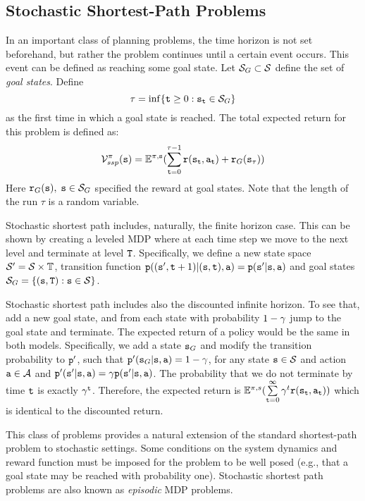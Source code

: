 \subsection{Stochastic Shortest-Path Problems}
In an important class of planning problems, the time horizon is not
set beforehand, but rather the problem continues until a certain
event occurs. This event can be defined as reaching some goal state.
Let  ${\mathcal{S}_G} \subset \mathcal{S}$ define the set of \emph{goal
states}. Define
\[\tau  = \inf \{ {\tt t} \ge 0:{{\tt s}_{\tt t}} \in {\mathcal{S}_G}\} \]
as the first time in which a goal state is reached. The total expected return for this problem is defined as:
\[\mathcal{V}_{ssp}^\pi ({\tt s}) = {\mathbb{E}^{\pi ,{\tt s}}}(\sum\limits_{{\tt t} = 0}^{\tau  - 1} {{\tt r}({{\tt s}_{\tt t}},{{\tt a}_{\tt t}})}  + {{\tt r}_G}({{\tt s}_\tau }))\]
Here ${{\tt r}_G}({\tt s}),\;{\tt s} \in {\mathcal{S}_G}$ specified the
reward at goal states. Note that the length of the run $\tau$ is a random variable.



Stochastic shortest path includes, naturally, the finite horizon case. This can be shown by creating a leveled MDP where at each time step we move to the next level and terminate at level ${\tt T}$.
Specifically, we define a new state space $\mathcal{S}'=\mathcal{S}\times \mathbb{T}$, transition function ${\tt p}(({\tt s}',{\tt t}+1)|({\tt s},{\tt t}),{\tt a})={\tt p}({\tt s}'|{\tt s},{\tt a})$ and goal states $\mathcal{S}_G=\{({\tt s},{\tt T}):{\tt s} \in\mathcal{S}\}$.

Stochastic shortest path includes also the discounted infinite
horizon. To see that, add a new goal state, and from each state with
probability $1-\gamma$ jump to the goal state and terminate. The
expected return of a policy would be the same in both models.
Specifically, we add a state ${\tt s}_G$ and modify the transition probability to ${\tt p}'$, such that
${\tt p}'({\tt s}_G|{\tt s},{\tt a})=1-\gamma$, for any state
${\tt s}\in\mathcal{S}$ and action ${\tt a}\in\mathcal{A}$ and
${\tt p}'({\tt s}'|{\tt s},{\tt a})=\gamma {\tt p}({\tt s}'|{\tt s},{\tt a})$. The
probability that we do not terminate by time ${\tt t}$ is exactly
$\gamma^{\tt t}$. Therefore, the expected return is $\mathbb{E}^{\pi ,s}(\sum\limits_{{\tt t} = 0}^\infty  {{\gamma^t}{\tt r}({{\tt s}_{\tt t}},{{\tt a}_{\tt t}})})$
which is
identical to the discounted return.

This class of problems provides a natural extension of the standard
shortest-path problem to stochastic settings.  Some conditions on
the system dynamics and reward function must be imposed for the
problem to be well posed (e.g., that a goal state may be reached
with probability one). Stochastic
shortest path problems are also known as \textit{episodic} MDP problems. 

